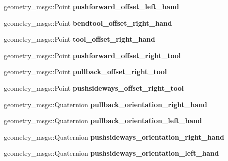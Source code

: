 \begin{DoxyCompactItemize}
\item 
\mbox{\label{structManipulate_acb2aa7fb1c4de66b9d13d4fd9eb89019}} 
geometry\+\_\+msgs\+::\+Point {\bfseries pushforward\+\_\+offset\+\_\+left\+\_\+hand}
\item 
\mbox{\label{structManipulate_a9d714dceff6ea9a6c1a141305eafffbf}} 
geometry\+\_\+msgs\+::\+Point {\bfseries bendtool\+\_\+offset\+\_\+right\+\_\+hand}
\item 
\mbox{\label{structManipulate_a474455e239193cc0d3bd8637250a9603}} 
geometry\+\_\+msgs\+::\+Point {\bfseries tool\+\_\+offset\+\_\+right\+\_\+hand}
\item 
\mbox{\label{structManipulate_aa2f8dee0bb46908f234b236c5331d010}} 
geometry\+\_\+msgs\+::\+Point {\bfseries pushforward\+\_\+offset\+\_\+right\+\_\+tool}
\item 
\mbox{\label{structManipulate_a1d5ed1475e67187a413c98af41fff869}} 
geometry\+\_\+msgs\+::\+Point {\bfseries pullback\+\_\+offset\+\_\+right\+\_\+tool}
\item 
\mbox{\label{structManipulate_af57da92aa674fb99bce34e52d37b59af}} 
geometry\+\_\+msgs\+::\+Point {\bfseries pushsideways\+\_\+offset\+\_\+right\+\_\+tool}
\item 
\mbox{\label{structManipulate_a50b08cb0af6ae4557ba93faea73ceb94}} 
geometry\+\_\+msgs\+::\+Quaternion {\bfseries pullback\+\_\+orientation\+\_\+right\+\_\+hand}
\item 
\mbox{\label{structManipulate_aac8c88487fce72b44a342a6035c2919c}} 
geometry\+\_\+msgs\+::\+Quaternion {\bfseries pullback\+\_\+orientation\+\_\+left\+\_\+hand}
\item 
\mbox{\label{structManipulate_ab1be4ed50d2651553bf5a67d2946d3c8}} 
geometry\+\_\+msgs\+::\+Quaternion {\bfseries pushsideways\+\_\+orientation\+\_\+right\+\_\+hand}
\item 
\mbox{\label{structManipulate_ade39377023b437f550649baa51a71689}} 
geometry\+\_\+msgs\+::\+Quaternion {\bfseries pushsideways\+\_\+orientation\+\_\+left\+\_\+hand}

\end{DoxyCompactItemize}
